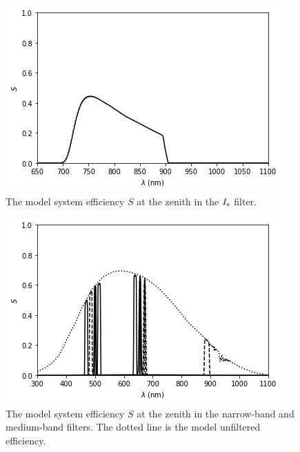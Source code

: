 \begin{figure}
\begin{center}
\includegraphics[width=0.7\linewidth]{figures/huitzi-f20-S-JC-Is.png}
\medskip
\caption{The model system efficiency $S$ at the zenith in the $\mbox{$I_\mathrm{s}$}$ filter.}
\end{center}
\end{figure}

\begin{figure}
\begin{center}
\includegraphics[width=0.7\linewidth]{figures/huitzi-f20-S-NBMB.png}
\medskip
\caption{The model system efficiency $S$ at the zenith in the narrow-band and medium-band filters. The dotted line is the model unfiltered efficiency.}
\end{center}
\end{figure}

